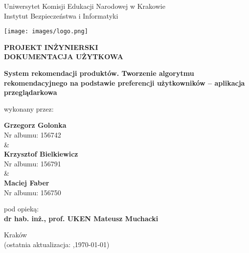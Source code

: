 \documentclass[12pt,a4paper,oneside]{article}
\theoremstyle{definition}
\numberwithin{equation}{section}
\begin{document}

\thispagestyle{empty} %
\begin{titlepage}
\begin{center}\Large
Uniwersytet Komisji Edukacji Narodowej w Krakowie\\
\large
Instytut Bezpieczeństwa i Informatyki\\
\vskip 10pt
\end{center}
\begin{center}
\centering \texttt{[image: images/logo.png]}
\end{center}

\begin{center}
 {\bf \fontsize{14pt}{14pt}\selectfont PROJEKT INŻYNIERSKI \\ DOKUMENTACJA UŻYTKOWA}
\end{center}
\vskip 5pt
\begin{center}
 {\bf \fontsize{15pt}{25pt}\selectfont System rekomendacji produktów. Tworzenie algorytmu rekomendacyjnego na
 podstawie preferencji użytkowników – aplikacja przeglądarkowa}
\end{center}

\begin{center}
 {\fontsize{12pt}{12pt}\selectfont wykonany przez: }
\end{center}
\begin{center}
 {\bf\fontsize{16pt}{16pt}\selectfont Grzegorz Golonka }\\
 {\fontsize{12pt}{12pt}\selectfont Nr albumu:  156742 \\\&\\}
 {\bf\fontsize{16pt}{16pt}\selectfont Krzysztof Bielkiewicz }\\
 {\fontsize{12pt}{12pt}\selectfont Nr albumu: 156791 \\\&\\}
 {\bf\fontsize{16pt}{16pt}\selectfont Maciej Faber }\\
 {\fontsize{12pt}{12pt}\selectfont Nr albumu: 156750}
\end{center}
\begin{center}
 {\fontsize{12pt}{12pt}\selectfont pod opieką:}\\
 {\bf\fontsize{12pt}{12pt}\selectfont dr hab. inż., prof. UKEN Mateusz Muchacki  }
\end{center}

\vspace*{\fill}
\begin{center}
\large
Kraków \the\year\\
(ostatnia aktualizacja: \DTMcurrenttime,\;\today)
\end{center}
\end{titlepage}
\setcounter{page}{0} 
\newpage\null\thispagestyle{empty}
\end{document}
